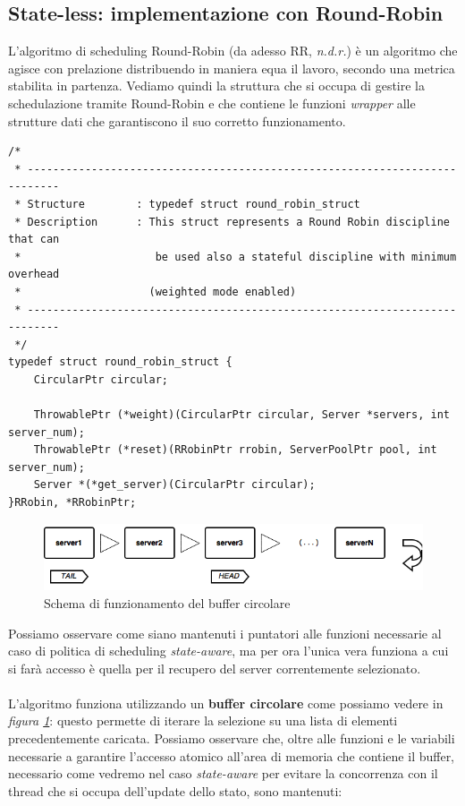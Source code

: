\documentclass[italian]{tktltiki2}
\begin{document}
\subsection{State-less: implementazione con Round-Robin}
L'algoritmo di scheduling Round-Robin (da adesso RR, \emph{n.d.r.}) è un algoritmo che agisce con prelazione distribuendo in maniera equa il lavoro, secondo una metrica stabilita in partenza. Vediamo quindi la struttura che si occupa di gestire la schedulazione tramite Round-Robin e che contiene le funzioni \emph{wrapper} alle strutture dati che garantiscono il suo corretto funzionamento.\\
\begin{lstlisting}
/*
 * ---------------------------------------------------------------------------
 * Structure        : typedef struct round_robin_struct
 * Description      : This struct represents a Round Robin discipline that can
 *                     be used also a stateful discipline with minimum overhead
 *                    (weighted mode enabled)
 * ---------------------------------------------------------------------------
 */
typedef struct round_robin_struct {
    CircularPtr circular;

    ThrowablePtr (*weight)(CircularPtr circular, Server *servers, int server_num);
    ThrowablePtr (*reset)(RRobinPtr rrobin, ServerPoolPtr pool, int server_num);
    Server *(*get_server)(CircularPtr circular);
}RRobin, *RRobinPtr;

\end{lstlisting}
\begin{figure}[b]
\centering
\includegraphics[width=\textwidth]{images/rrobin_stateless}
\caption{Schema di funzionamento del buffer circolare \label{fig: rrobin_sl}}
\end{figure}
Possiamo osservare come siano mantenuti i puntatori alle funzioni necessarie al caso di politica di scheduling \emph{state-aware}, ma per ora l'unica vera funziona a cui si farà accesso è quella per il recupero del server correntemente selezionato. \\\\
L'algoritmo funziona utilizzando un \textbf{buffer circolare} come possiamo vedere in \emph{figura \ref{fig: rrobin_sl}}: questo permette di iterare la selezione su una lista di elementi precedentemente caricata. Possiamo osservare che, oltre alle funzioni e le variabili necessarie a garantire l'accesso atomico all'area di memoria che contiene il buffer, necessario come vedremo nel caso \emph{state-aware} per evitare la concorrenza con il thread che si occupa dell'update dello stato, sono mantenuti:
\end{document}
